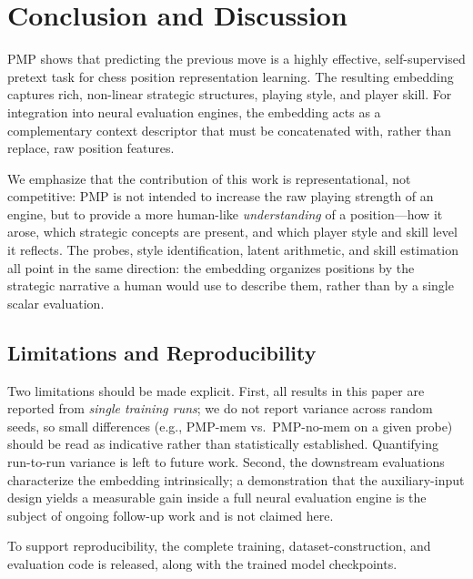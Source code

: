 \documentclass[journal]{IEEEtran}
\begin{document}
\section{Conclusion and Discussion}
PMP shows that predicting the previous move is a highly effective, self-supervised pretext task for chess position representation learning. The resulting embedding captures rich, non-linear strategic structures, playing style, and player skill. For integration into neural evaluation engines, the embedding acts as a complementary context descriptor that must be concatenated with, rather than replace, raw position features.

We emphasize that the contribution of this work is representational, not competitive: PMP is not intended to increase the raw playing strength of an engine, but to provide a more human-like \emph{understanding} of a position---how it arose, which strategic concepts are present, and which player style and skill level it reflects. The probes, style identification, latent arithmetic, and skill estimation all point in the same direction: the embedding organizes positions by the strategic narrative a human would use to describe them, rather than by a single scalar evaluation.

\subsection{Limitations and Reproducibility}
Two limitations should be made explicit. First, all results in this paper are reported from \emph{single training runs}; we do not report variance across random seeds, so small differences (e.g., PMP-mem vs.\ PMP-no-mem on a given probe) should be read as indicative rather than statistically established. Quantifying run-to-run variance is left to future work. Second, the downstream evaluations characterize the embedding intrinsically; a demonstration that the auxiliary-input design yields a measurable gain inside a full neural evaluation engine is the subject of ongoing follow-up work and is not claimed here.

To support reproducibility, the complete training, dataset-construction, and evaluation code is released, along with the trained model checkpoints. %



\end{document}
